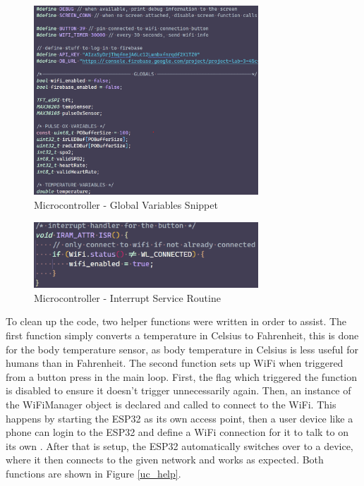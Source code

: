 \documentclass[12pt]{article}
\begin{document}
    \begin{figure}[ht]
        \centering
        \includegraphics[width=0.75\textwidth]{uc_globals}
        \caption{Microcontroller - Global Variables Snippet}
        \label{uc_var}
    \end{figure} 

    \begin{figure}[ht]
        \centering
        \includegraphics[width=0.75\textwidth]{uc_isr}
        \caption{Microcontroller - Interrupt Service Routine}
        \label{uc_isr}
    \end{figure} 

    To clean up the code, two helper functions were written in order to assist. The first function simply converts a temperature in Celsius to Fahrenheit, this is done for the body temperature sensor, as body temperature in Celsius is less useful for humans than in Fahrenheit. The second function sets up WiFi when triggered from a button press in the main loop. First, the flag which triggered the function is disabled to ensure it doesn't trigger unnecessarily again. Then, an instance of the WiFiManager object is declared and called to connect to the WiFi. This happens by starting the ESP32 as its own access point, then a user device like a phone can login to the ESP32 and define a WiFi connection for it to talk to on its own \cite{wifi_manager}. After that is setup, the ESP32 automatically switches over to a device, where it then connects to the given network and works as expected. Both functions are shown in Figure \ref{uc_help}.
\end{document}

